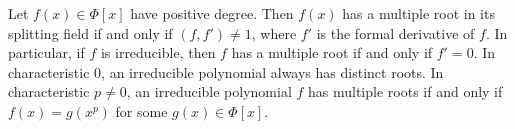 Let $f(x) \in \Phi[x]$ have positive degree. Then $f(x)$ has a multiple root in its splitting field if and only if $(f, f') \neq 1$, where $f'$ is the formal derivative of $f$. In particular, if $f$ is irreducible, then $f$ has a multiple root if and only if $f' = 0$. In characteristic $0$, an irreducible polynomial always has distinct roots. In characteristic $p \neq 0$, an irreducible polynomial $f$ has multiple roots if and only if $f(x) = g(x^p)$ for some $g(x) \in \Phi[x]$.
